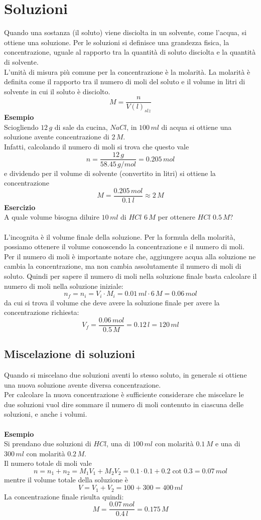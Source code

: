\documentclass[12pt]{article}
\begin{document}
\section{Soluzioni}
Quando una sostanza (il soluto) viene disciolta in un solvente, come l'acqua, si ottiene una soluzione. Per le soluzioni si definisce una grandezza fisica, la concentrazione, uguale al rapporto tra 
la quantità di soluto disciolta e la quantità di solvente. \\
L'unità di misura più comune per la concentrazione è la molarità. La molarità è definita come il rapporto tra il numero di moli del soluto e il volume in litri di solvente in cui il soluto è 
disciolto.
$$
    M = \frac{n}{V(l)_{slz}}
$$
\textbf{Esempio} \\
Sciogliendo $12\,g$ di sale da cucina, $NaCl$, in $100\,ml$ di acqua si ottiene una soluzione avente concentrazione di $2\,M$. \\
Infatti, calcolando il numero di moli si trova che questo vale
$$
    n = \frac{12\,g}{58.45\,g/mol} = 0.205\,mol
$$
e dividendo per il volume di solvente (convertito in litri) si ottiene la concentrazione
$$
    M = \frac{0.205\,mol}{0.1\,l} \approx 2\,M
$$
\textbf{Esercizio} \\
A quale volume bisogna diluire $10\,ml$ di $HCl$ $6\,M$ per ottenere $HCl$ $0.5\,M$? \\ \\
L'incognita è il volume finale della soluzione. Per la formula della molarità, possiamo ottenere il volume conoscendo la concentrazione e il numero di moli. \\
Per il numero di moli è importante notare che, aggiungere acqua alla soluzione ne cambia la concentrazione, ma non cambia assolutamente il numero di moli di soluto. Quindi per sapere il numero di
moli nella soluzione finale basta calcolare il numero di moli nella soluzione iniziale:
$$
    n_f = n_i = V_i\cdot M_i = 0.01\,ml \cdot 6\,M = 0.06\,mol
$$
da cui si trova il volume che deve avere la soluzione finale per avere la concentrazione richiesta:
$$
    V_f = \frac{0.06\,mol}{0.5\,M} = 0.12\,l = 120\,ml
$$
\subsection{Miscelazione di soluzioni}
Quando si miscelano due soluzioni aventi lo stesso soluto, in generale si ottiene una nuova soluzione avente diversa concentrazione. \\
Per calcolare la nuova concentrazione è sufficiente considerare che miscelare le due soluzioni vuol dire sommare il numero di moli contenuto in ciascuna delle soluzioni, e anche i volumi. \\ \\
\textbf{Esempio} \\
Si prendano due soluzioni di $HCl$, una di $100\,ml$ con molarità $0.1\,M$ e una di $300\,ml$ con molarità $0.2\,M$. \\
Il numero totale di moli vale 
$$
    n = n_1 + n_2 = M_1V_1 + M_2V_2 = 0.1\cdot 0.1 + 0.2\cot 0.3 = 0.07\,mol
$$
mentre il volume totale della soluzione è
$$
    V = V_1 + V_2 = 100 + 300 = 400\,ml
$$
La concentrazione finale risulta quindi:
$$
    M = \frac{0.07\,mol}{0.4\,l} = 0.175\,M
$$
\end{document}
